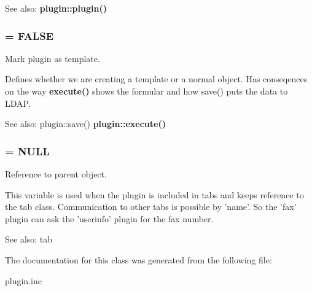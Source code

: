 \begin{Desc}
\item[See also:]{\bf plugin::plugin()} \end{Desc}
\subsubsection{ = FALSE}\label{classplugin_o2}


Mark plugin as template. 

Defines whether we are creating a template or a normal object. Has conseqences on the way {\bf execute()} shows the formular and how save() puts the data to LDAP.

\begin{Desc}
\item[See also:]plugin::save() {\bf plugin::execute()} \end{Desc}
\subsubsection{ = NULL}\label{classplugin_o0}


Reference to parent object. 

This variable is used when the plugin is included in tabs and keeps reference to the tab class. Communication to other tabs is possible by 'name'. So the 'fax' plugin can ask the 'userinfo' plugin for the fax number.

\begin{Desc}
\item[See also:]tab \end{Desc}


The documentation for this class was generated from the following file:\begin{CompactItemize}
\item 
plugin.inc\end{CompactItemize}
